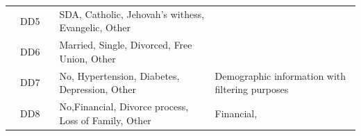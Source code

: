 \documentclass[]{book}
\begin{document}
\begin{table}[ht]
\begin{tabular}{|l|l|l|p{5cm}|p{4cm}|}
        & DD5                                   &                                    & SDA, Catholic, Jehovah's withess, Evangelic, Other                                       &                                       \\ \cline{2-2} \cline{4-4} 
        & DD6                                   &                                    & Married, Single, Divorced, Free Union, Other                                             &                                                                 \\ \cline{2-2} \cline{4-5} 
        & DD7                                   &                                    & No, Hypertension, Diabetes, Depression, Other                                            & Demographic information with filtering purposes                 \\ \cline{2-5} 
        & DD8                                   &                                    & No,Financial, Divorce process, Loss of Family, Other                                     & Financial,                                                      \\ \hline
    \end{tabular}
\end{table}
\end{document}
